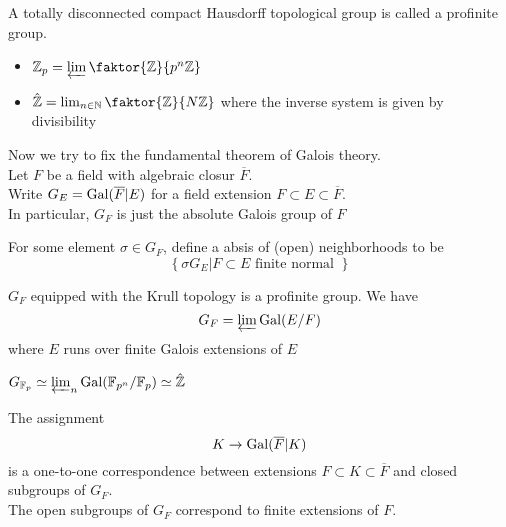 \documentclass[../main.tex]{subfiles}
\begin{document}
\begin{defn}
A totally disconnected compact Hausdorff topological group is called a profinite group.
\end{defn}
\begin{exemple}
\begin{itemize}
\item $ \mathbb{Z}_p = \varprojlim \faktor{\mathbb{Z}}{p^{n}\mathbb{Z}}$ 
\item $ \hat{\mathbb{Z}}= \lim_{n \in \mathbb{N}} \faktor{\mathbb{Z}}{ N \mathbb{Z}}$ where the inverse system is given by divisibility
\end{itemize}
\end{exemple}
Now we try to fix the fundamental theorem of Galois theory.\\
Let $F$ be a field with algebraic closur $ \overline{F}$.\\
Write $G_E = \operatorname{Gal}( \overline{F}| E) $ for a field extension $F \subset E \subset \overline{F}$.\\
In particular, $G_F$ is just the absolute Galois group of $F$ 
\begin{defn}
	For some element $\sigma \in G_F$, define a absis of (open) neighborhoods to be 
	\[ 
\left\{ \sigma G_E | F \subset E \text{ finite normal }  \right\} 	
	\]
	
\end{defn}
\begin{propo}
$G_F$ equipped with the Krull topology is a profinite group. We have
\[ 
G_F = \varprojlim \operatorname{Gal}( E/F) 
\]
where $E$ runs over finite Galois extensions of $E$ 
\end{propo}
\begin{crly}
$G_{\mathbb{F}_p} \simeq \varprojlim_n \operatorname{Gal}( \mathbb{F}_{p^{n}} / \mathbb{F}_p)\simeq \hat{\mathbb{Z}} $ 
\end{crly}
\begin{thm}
	The assignment 
	\[ 
K \to  \operatorname{Gal} ( \overline{F}| K) 	
	\]
	is a one-to-one correspondence between extensions $F \subset K \subset \overline{F}$ and closed subgroups of $G_F$.\\
	The open subgroups of $G_F$ correspond to finite extensions of $F$.
\end{thm}
\end{document}
